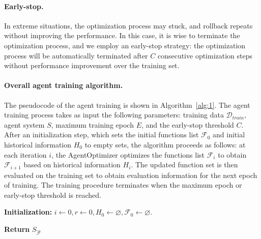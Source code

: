 \documentclass{article}
\theoremstyle{plain}
\theoremstyle{definition}
\theoremstyle{remark}
\begin{document}
\paragraph{Early-stop.}

In extreme situations, the optimization process may stuck, and rollback repeats without improving the performance. In this case, it is wise to terminate the optimization process, and we employ an early-stop strategy: the optimization process will be automatically terminated after $C$ consecutive optimization steps without performance improvement over the training set.

\paragraph{Overall agent training algorithm.}
The pseudocode of the agent training is shown in Algorithm~\ref{alg:1}.
The agent training process takes as input the following parameters: training data $\mathcal{D}_{train}$, agent system $S$, maximum training epoch $E$, and the early-stop threshold $C$.
After an initialization step, which sets the initial functions list $\mathcal{F}_{0}$ and initial historical information $H_{0}$ to empty sets, the algorithm proceeds as follows: at each iteration $i$,  the AgentOptimizer optimizes the functions list $\mathcal{F}_{i}$ to obtain $\mathcal{F}_{i+1}$ based on historical information $H_{i}$.  The updated function set is then evaluated on the training set to obtain evaluation information for the next epoch of training. The training procedure terminates when the maximum epoch or early-stop threshold is reached.


\begin{algorithm}[!htb]\small
\SetNoFillComment
\SetAlCapNameFnt{\small}
\SetAlCapFnt{\small}
\renewcommand{\baselinestretch}{0.5}
\caption{Agent Training}
\label{alg:1}
\textbf{Initialization:} $i \gets 0, r \gets 0, H_{0} \gets \varnothing, \mathcal{F}_{0} \gets \varnothing$.

\textbf{Return} $S_{\mathcal{\hat{F}}}$ 

\end{algorithm}
\vspace{-0.2in}
\end{document}
